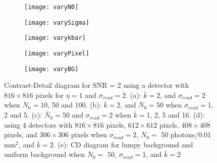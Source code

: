 \begin{figure}[ht]
	\begin{subfigure}[b]{0.3\linewidth}
		\texttt{[image: varyN0]}
		\caption{}
		\label{fig:varyN0}
	\end{subfigure}
	\hspace{0.2cm}
	\begin{subfigure}[b]{0.3\linewidth}
		\texttt{[image: varySigma]}
		\caption{}
		\label{fig:varySigma}
	\end{subfigure}
	\hspace{0.2cm}	
	\begin{subfigure}[b]{0.3\linewidth}
		\texttt{[image: varykbar]}
		\caption{}
		\label{fig:varykbar}
	\end{subfigure}
	\begin{subfigure}[b]{0.3\linewidth}
		\texttt{[image: varyPixel]}
		\caption{}
		\label{fig:varyPixel}
	\end{subfigure}	
	\hspace{0.2cm}	
	\begin{subfigure}[b]{0.3\linewidth}
		\texttt{[image: varyBG]}
		\caption{}
		\label{fig:varyBG}
	\end{subfigure}
\caption{Contrast-Detail diagram for SNR = 2 using a detector with $816 \times 816$ pixels for $\eta = 1$ and $\sigma_{read} = 2$.  (a): $\bar{k} = 2$, and $\sigma_{read} = 2$ when $\overline{N}_0 = $10, 50 and 100.  (b): $\bar{k} = 2$, and $\overline{N}_0 = 50$ when $ \sigma_{read} = $1, 2 and 5.  (c): $\bar{N}_0 = 50$ and $\sigma_{read} = 2$ when $\bar{k} = $1, 2, 5 and 16.  (d): using 4 detectors with $816 \times 816$ pixels, $612 \times 612$ pixels, $408 \times 408$ pixels, and $306 \times 306$ pixels when $\sigma_{read} = 2$, $\overline{N}_0 =$ 50 photons/0.01 mm$^2$, and $\bar{k} = 2$. (e): CD diagram for lumpy background and uniform background when $\overline{N}_0 =$ 50, $\sigma_{read} = $1, and $\bar{k} = $2}
\label{fig:CD} 
\end{figure}


